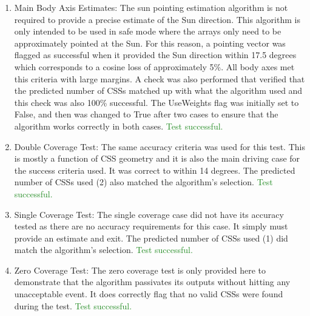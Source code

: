 \documentclass[]{BasiliskReportMemo}
\begin{document}
\begin{enumerate}
\item{Main Body Axis Estimates: The sun pointing estimation algorithm is not 
   required to provide a precise estimate of the Sun direction.  This algorithm 
   is only intended to be used in safe mode where the arrays only need to be 
   approximately pointed at the Sun.  For this reason, a pointing vector 
   was flagged as successful when it provided the Sun direction within 17.5 
   degrees which corresponds to a cosine loss of approximately 5\%.  All body 
   axes met this criteria with large margins.  A check was also performed that 
   verified that the predicted number of CSSs matched up with what the 
   algorithm used and this check was also 100\% successful.  The UseWeights flag 
   was initially set to False, and then was changed to True after two cases to 
   ensure that the algorithm works correctly in both cases. 
    \textcolor{ForestGreen}{Test successful.}}
\item{Double Coverage Test: The same accuracy criteria was used for this test.  
   This is mostly a function of CSS geometry and it is also the main driving 
   case for the success criteria used.  It was correct to within 14 degrees. 
   The predicted number of CSSs used (2) also matched the algorithm's selection. 
    \textcolor{ForestGreen}{Test successful.}}
\item{Single Coverage Test: The single coverage case did not have its accuracy 
   tested as there are no accuracy requirements for this case.  It simply must 
   provide an estimate and exit.  The predicted number of CSSs used (1) did  
   match the algorithm's selection.  \textcolor{ForestGreen}{Test successful.}}
\item{Zero Coverage Test: The zero coverage test is only provided here to 
   demonstrate that the algorithm passivates its outputs without hitting any 
   unacceptable event.  It does correctly flag that no valid CSSs were found 
   during the test. \textcolor{ForestGreen}{Test successful.}}
   

\end{enumerate}
\end{document}
